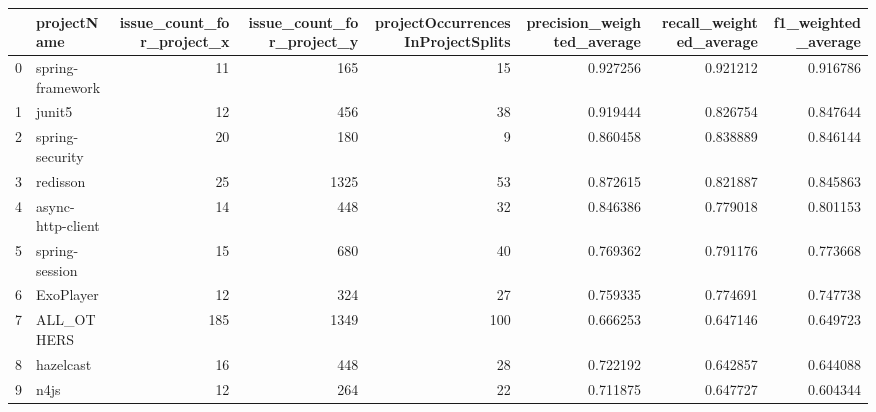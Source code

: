 \begin{tabular}{llrrrrrr}
\toprule
{} &        projectName &  issue\_count\_for\_project\_x &  issue\_count\_for\_project\_y &  projectOccurrencesInProjectSplits &  precision\_weighted\_average &  recall\_weighted\_average &  f1\_weighted\_average \\
\midrule
0  &   spring-framework &                         11 &                        165 &                                 15 &                    0.927256 &                 0.921212 &             0.916786 \\
1  &             junit5 &                         12 &                        456 &                                 38 &                    0.919444 &                 0.826754 &             0.847644 \\
2  &    spring-security &                         20 &                        180 &                                  9 &                    0.860458 &                 0.838889 &             0.846144 \\
3  &           redisson &                         25 &                       1325 &                                 53 &                    0.872615 &                 0.821887 &             0.845863 \\
4  &  async-http-client &                         14 &                        448 &                                 32 &                    0.846386 &                 0.779018 &             0.801153 \\
5  &     spring-session &                         15 &                        680 &                                 40 &                    0.769362 &                 0.791176 &             0.773668 \\
6  &          ExoPlayer &                         12 &                        324 &                                 27 &                    0.759335 &                 0.774691 &             0.747738 \\
7  &         ALL\_OTHERS &                        185 &                       1349 &                                100 &                    0.666253 &                 0.647146 &             0.649723 \\
8  &          hazelcast &                         16 &                        448 &                                 28 &                    0.722192 &                 0.642857 &             0.644088 \\
9  &               n4js &                         12 &                        264 &                                 22 &                    0.711875 &                 0.647727 &             0.604344 \\

\end{tabular}
